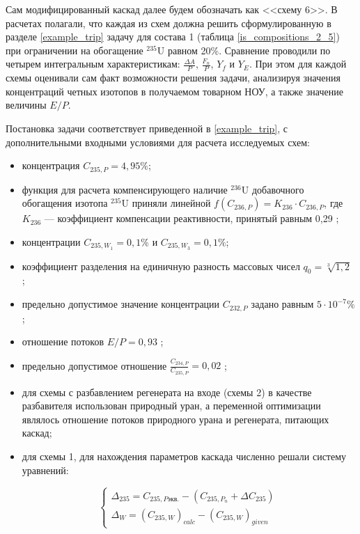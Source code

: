 Сам модифицированный каскад далее будем обозначать как <<схему 6>>. В расчетах полагали, что каждая из схем должна решить сформулированную в разделе \ref{example_trip} задачу для состава 1 (таблица \ref{is_compositions_2_5}) при ограничении на обогащение $^{235}$U равном 20\%. Сравнение проводили по четырем интегральным характеристикам: $\frac{\Delta A}{P}$, $\frac{F_n}{P}$, $Y_f$ и $Y_E$. При этом для каждой схемы оценивали сам факт возможности решения задачи, анализируя значения концентраций четных изотопов в получаемом товарном НОУ, а также значение величины $E/P$. 

Постановка задачи соответствует приведенной в \ref{example_trip}, с дополнительными входными условиями для расчета исследуемых схем:

\begin{itemize}
    \item концентрация $C_{235,{P}} = {4,95\%}$; 
    \item функция для расчета компенсирующего наличие $^{236}$U добавочного обогащения изотопа $^{235}$U приняли линейной $f(C_{236,P}) = {K_{236}\cdot{C_{236,{P}}}}$, где $K_{236}$ --- коэффициент компенсации реактивности, принятый равным 0,29 \cite{smirnovEvolutionIsotopicComposition2012};
    \item концентрации $C_{235,{W_1}} = 0,1\%$ и $C_{235,{W_3}} = 0,1\%$;
    \item коэффициент разделения на единичную разность массовых чисел $q_{0} = \sqrt[3]{1,2}$ \cite{smirnovEvolutionIsotopicComposition2012};
    \item предельно допустимое значение концентрации $C_{232,{P}}$ задано равным $5\cdot10^{-7} \%$;
    \item отношение потоков $E/P = 0,93$ \cite{2024smirnovObogashchenieRegenerirovannogoUrana2018};
    \item предельно допустимое отношение $\frac{C_{234,{P}}}{C_{235,{P}}} = 0,02$ \cite{2024smirnovObogashchenieRegenerirovannogoUrana2018};
    \item для схемы с разбавлением регенерата на входе (схемы 2) в качестве разбавителя использован природный уран, а переменной оптимизации являлось отношение потоков природного урана и регенерата, питающих каскад;
    \item для схемы 1, для нахождения параметров каскада численно решали систему уравнений:
    
    \begin{equation}\label{snau_sch1}
  \begin{cases}
  \Delta_{235}=C_{235,P\textit{экв.}}-(C_{235,{P_n}}+\Delta C_{235})\\
  \Delta_{W} = {(C_{235, W})}_{calc}-{(C_{235, W})}_{given}
  \end{cases}\,
\end{equation}
    

\end{itemize}
